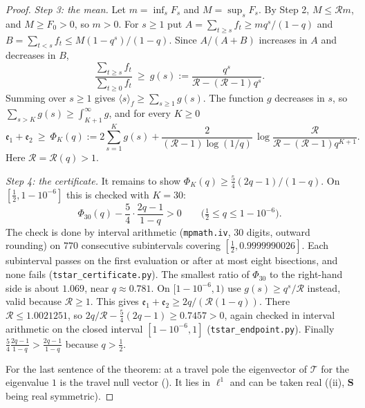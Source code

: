 \documentclass[11pt]{article}
\theoremstyle{plain}
\theoremstyle{definition}
\theoremstyle{remark}
\begin{document}
\begin{proof}
\emph{Step 3: the mean.} Let $m=\inf_sF_s$ and $M=\sup_sF_s$. By Step 2, $M\le\mathcal R m$, and
$M\ge F_0>0$, so $m>0$. For $s\ge1$ put $A=\sum_{t\ge s}f_t\ge mq^s/(1-q)$ and
$B=\sum_{t<s}f_t\le M(1-q^s)/(1-q)$. Since $A/(A+B)$ increases in $A$ and decreases in $B$,
\[
   \frac{\sum_{t\ge s}f_t}{\sum_{t\ge0}f_t}\ \ge\ g(s):=\frac{q^s}{\mathcal R-(\mathcal R-1)q^s} .
\]
Summing over $s\ge1$ gives $\langle s\rangle_f\ge\sum_{s\ge1}g(s)$. The function $g$ decreases in
$s$, so $\sum_{s>K}g(s)\ge\int_{K+1}^\infty g$, and for every $K\ge0$
\[
   \mathfrak e_1+\mathfrak e_2\ \ge\ \Phi_K(q):=2\sum_{s=1}^Kg(s)
   +\frac{2}{(\mathcal R-1)\log(1/q)}\,
   \log\frac{\mathcal R}{\mathcal R-(\mathcal R-1)q^{K+1}} .
\]
Here $\mathcal R=\mathcal R(q)>1$.

\emph{Step 4: the certificate.} It remains to show $\Phi_K(q)\ge\frac54(2q-1)/(1-q)$. On
$[\tfrac12,1-10^{-6}]$ this is checked with $K=30$:
\begin{equation}\label{eq:Tstarcert}
   \Phi_{30}(q)-\frac54\cdot\frac{2q-1}{1-q}>0\qquad\bigl(\tfrac12\le q\le1-10^{-6}\bigr).
\end{equation}
The check is done by interval arithmetic (\texttt{mpmath.iv}, $30$ digits, outward rounding) on $770$
consecutive subintervals covering $[\tfrac12,0.9999990026]$. Each subinterval passes on the first
evaluation or after at most eight bisections, and none fails (\texttt{tstar\_certificate.py}).
The smallest ratio of $\Phi_{30}$ to the right-hand side is about $1.069$, near $q\approx0.781$.
On $[1-10^{-6},1)$ use $g(s)\ge q^s/\mathcal R$ instead, valid because $\mathcal R\ge1$. This
gives $\mathfrak e_1+\mathfrak e_2\ge2q/(\mathcal R(1-q))$. There $\mathcal R\le1.0021251$, so
$2q/\mathcal R-\frac54(2q-1)\ge0.7457>0$, again checked in interval arithmetic on the closed
interval $[1-10^{-6},1]$ (\texttt{tstar\_endpoint.py}). Finally $\frac54\frac{2q-1}{1-q}>\frac{2q-1}{1-q}$
because $q>\tfrac12$.

For the last sentence of the theorem: at a travel pole the eigenvector of $\mathcal T$ for the
eigenvalue $1$ is the travel null vector ({\cite[Corollary ``the travel poles are Hahn--Exton zeros'', \textup{cor:qbessel}]{Bonfioli2026bA}}). It lies in $\ell^1$ and can be taken real
({\cite[Theorem ``the travel determinant'', \textup{thm:fredholm}]{Bonfioli2026bA}}\textup{(ii)}, $\mathbf S$ being real symmetric).
\end{proof}
\end{document}
